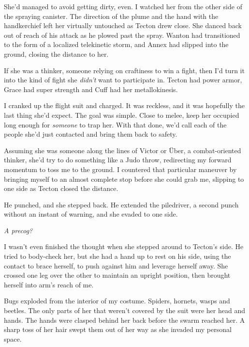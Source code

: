 She'd managed to avoid getting dirty, even.  I watched her from the other side of the spraying canister.  The direction of the plume and the hand with the handkerchief left her virtually untouched as Tecton drew close.  She danced back out of reach of his attack as he plowed past the spray.  Wanton had transitioned to the form of a localized telekinetic storm, and Annex had slipped into the ground, closing the distance to her.



If she was a thinker, someone relying on craftiness to win a fight, then I'd turn it into the kind of fight she \emph{didn't} want to participate in.  Tecton had power armor, Grace had super strength and Cuff had her metallokinesis.



I cranked up the flight suit and charged.  It was reckless, and it was hopefully the last thing she'd expect.  The goal was simple.  Close to melee, keep her occupied long enough for \emph{someone} to trap her.  With that done, we'd call each of the people she'd just contacted and bring them back to safety.



Assuming she was someone along the lines of Victor or \"{U}ber, a combat-oriented thinker, she'd try to do something like a Judo throw, redirecting my forward momentum to toss me to the ground.  I countered that particular maneuver by bringing myself to an almost complete stop before she could grab me, slipping to one side as Tecton closed the distance.



He punched, and she stepped back.  He extended the piledriver, a second punch without an instant of warning, and she evaded to one side.



\emph{A precog?}



I wasn't even finished the thought when she stepped around to Tecton's side.  He tried to body-check her, but she had a hand up to rest on his side, using the contact to brace herself, to push against him and leverage herself away.  She crossed one leg over the other to maintain an upright position, then brought herself into arm's reach of me.



Bugs exploded from the interior of my costume.  Spiders, hornets, wasps and beetles.  The only parts of her that weren't covered by the suit were her head and hands.  The hands were clasped behind her back before the swarm reached her.  A sharp toss of her hair swept them out of her way as she invaded my personal space.




